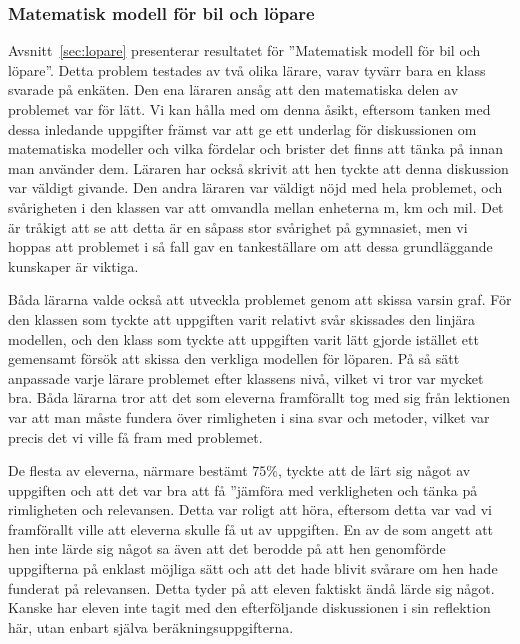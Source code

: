 \subsubsection{Matematisk modell för bil och löpare}
    \textcolor{lila}{Avsnitt~\ref{sec:lopare} presenterar resultatet för ''Matematisk modell för bil och löpare''. Detta problem testades av två olika lärare, varav tyvärr bara en klass svarade på enkäten. Den ena läraren ansåg att den matematiska delen av problemet var för lätt. Vi kan hålla med om denna åsikt, eftersom tanken med dessa inledande uppgifter främst var att ge ett underlag för diskussionen om matematiska modeller och vilka fördelar och brister det finns att tänka på innan man använder dem. Läraren har också skrivit att hen tyckte att denna diskussion var väldigt givande. Den andra läraren var väldigt nöjd med hela problemet, och svårigheten i den klassen var att omvandla mellan enheterna m, km och mil. Det är tråkigt att se att detta är en såpass stor svårighet på gymnasiet, men vi hoppas att problemet i så fall gav en tankeställare om att dessa grundläggande kunskaper är viktiga.}

    \textcolor{lila}{Båda lärarna valde också att utveckla problemet genom att skissa varsin graf. För den klassen som tyckte att uppgiften varit relativt svår skissades den linjära modellen, och den klass som tyckte att uppgiften varit lätt gjorde istället ett gemensamt försök att skissa den verkliga modellen för löparen. På så sätt anpassade varje lärare problemet efter klassens nivå, vilket vi tror var mycket bra. Båda lärarna tror att det som eleverna framförallt tog med sig från lektionen var att man måste fundera över rimligheten i sina svar och metoder, vilket var precis det vi ville få fram med problemet.}

    \textcolor{lila}{De flesta av eleverna, närmare bestämt $75\%$, tyckte att de lärt sig något av uppgiften och att det var bra att få ''jämföra med verkligheten och tänka på rimligheten och relevansen. Detta var roligt att höra, eftersom detta var vad vi framförallt ville att eleverna skulle få ut av uppgiften. En av de som angett att hen inte lärde sig något sa även att det berodde på att hen genomförde uppgifterna på enklast möjliga sätt och att det hade blivit svårare om hen hade funderat på relevansen. Detta tyder på att eleven faktiskt ändå lärde sig något. Kanske har eleven inte tagit med den efterföljande diskussionen i sin reflektion här, utan enbart själva beräkningsuppgifterna. }

